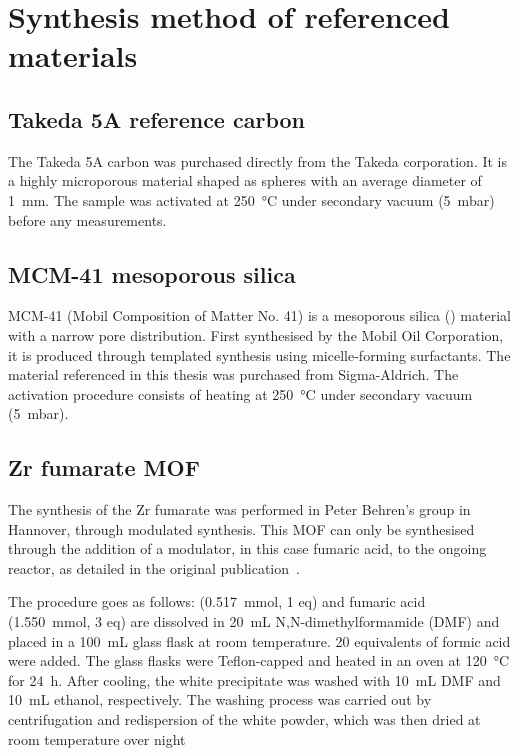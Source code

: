 
\graphicspath{ {\thisappx/figures/} }

\chapter{Synthesis method of referenced materials}%
\label{appx:synthesis}

\section{Takeda 5A reference carbon}%
\label{appx:synthesis:takeda}

The Takeda 5A carbon was purchased directly from the Takeda corporation.
It is a highly microporous material shaped as spheres with an average
diameter of \SI{1}{\milli\metre}.
The sample was activated at \SI{250}{\celsius} under 
secondary vacuum (\SI{5}{\milli\bar}) before any measurements.

\section{MCM-41 mesoporous silica}%
\label{appx:synthesis:mcm41}

MCM-41 (Mobil Composition of Matter No. 41) is a mesoporous silica 
() material with a narrow pore distribution. First synthesised 
by the Mobil Oil Corporation, it is produced through templated 
synthesis using micelle-forming surfactants.
The material referenced in this thesis was purchased from Sigma-Aldrich.
The activation procedure consists of heating at \SI{250}{\celsius} under 
secondary vacuum (\SI{5}{\milli\bar}).

\section{Zr fumarate MOF}%
\label{appx:synthesis:zrformate}

The synthesis of the Zr fumarate was performed in Peter Behren's 
group in Hannover, through modulated synthesis. This MOF can only
be synthesised through the addition of a modulator, in this case
fumaric acid, to the ongoing reactor, as detailed in the 
original publication~\cite{wissmannModulatedSynthesisZrfumarate2012}.

The procedure goes as follows: 
(\SI{0.517}{\milli\mol}, 1 eq) and fumaric acid 
(\SI{1.550}{\milli\mol}, 3 eq) are dissolved 
in \SI{20}{\milli\liter} N,N-dimethylformamide (DMF) 
and placed in a \SI{100}{\milli\liter} glass flask at room 
temperature. 20 equivalents of formic acid were added.
The glass flasks were Teflon-capped and heated in an oven at
\SI{120}{\degreeCelsius} for \SI{24}{\hour}. After cooling, 
the white precipitate was washed with \SI{10}{\milli\liter} 
DMF and \SI{10}{\milli\liter} ethanol, respectively. 
The washing process was carried out by centrifugation and 
redispersion of the white powder, which was then
dried at room temperature over night



